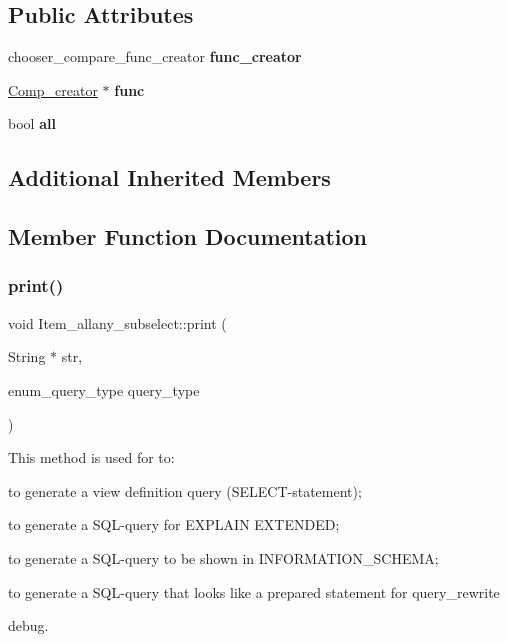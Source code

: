 \subsection*{Public Attributes}
\begin{DoxyCompactItemize}
\item 
\mbox{\label{classItem__allany__subselect_aaa717d12646231e020772c4d46cc86cd}} 
chooser\+\_\+compare\+\_\+func\+\_\+creator {\bfseries func\+\_\+creator}
\item 
\mbox{\label{classItem__allany__subselect_a2b3846e39f5f8dad85ed8499656e6da0}} 
\mbox{\hyperlink{classComp__creator}{Comp\+\_\+creator}} $\ast$ {\bfseries func}
\item 
\mbox{\label{classItem__allany__subselect_ac431da1e3ac10d9a3817dc146a127bbd}} 
bool {\bfseries all}
\end{DoxyCompactItemize}
\subsection*{Additional Inherited Members}


\subsection{Member Function Documentation}
\mbox{\label{classItem__allany__subselect_ade4b2eaa6af0cde005b082598d2e31b0}} 
\subsubsection{\texorpdfstring{print()}{print()}}
{\footnotesize\ttfamily void Item\+\_\+allany\+\_\+subselect\+::print (\begin{DoxyParamCaption}\item[{String $\ast$}]{str,  }\item[{enum\+\_\+query\+\_\+type}]{query\+\_\+type }\end{DoxyParamCaption})\hspace{0.3cm}{\ttfamily [virtual]}}

This method is used for to\+:
\begin{DoxyItemize}
\item to generate a view definition query (S\+E\+L\+E\+CT-\/statement);
\item to generate a S\+QL-\/query for E\+X\+P\+L\+A\+IN E\+X\+T\+E\+N\+D\+ED;
\item to generate a S\+QL-\/query to be shown in I\+N\+F\+O\+R\+M\+A\+T\+I\+O\+N\+\_\+\+S\+C\+H\+E\+MA;
\item to generate a S\+QL-\/query that looks like a prepared statement for query\+\_\+rewrite
\item debug.
\end{DoxyItemize}

